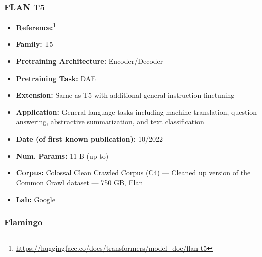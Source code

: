 \documentclass{article}
\begin{document}
\subsubsection{FLAN T5}

            \begin{itemize}
                \item \textbf{Reference:}\footnote{\url{https://huggingface.co/docs/transformers/model_doc/flan-t5}}\cite{chung2022flan}
                \item \textbf{Family:} T5
                \item \textbf{Pretraining Architecture:} Encoder/Decoder
                \item \textbf{Pretraining Task:} DAE
                \item \textbf{Extension:} Same as T5 with additional general instruction finetuning
                \item \textbf{Application:} General language tasks including machine translation, question answering, abstractive summarization, and text classification
                \item \textbf{Date (of first known publication):} 10/2022
                \item \textbf{Num. Params:} 11 B (up to)
                \item \textbf{Corpus:} Colossal Clean Crawled Corpus (C4) — Cleaned up version of the Common Crawl dataset — 750 GB, Flan
                \item \textbf{Lab:} Google
            \end{itemize}

\subsubsection{Flamingo}
\end{document}
